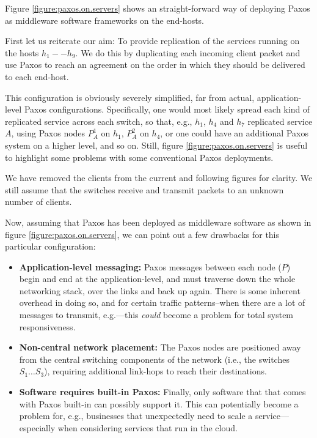Figure \vref{figure:paxos.on.servers} shows an straight-forward way of deploying
Paxos as middleware software frameworks on the end-hosts.

First let us reiterate our aim: To provide replication of the services
running on the hosts $h_1--h_9$. We do this by duplicating each incoming
client packet and use Paxos to reach an agreement on the order in which they
should be delivered to each end-host.

This configuration is obviously severely simplified, far from actual,
application-level Paxos configurations.
%
Specifically, one would most likely
spread each kind of replicated service across each switch, so that, e.g.,
$h_1$, $h_4$ and $h_7$ replicated service $A$, using Paxos nodes
$P_A^1$ on $h_1$, $P_A^2$ on $h_4$, or one could have an additional Paxos
system on a higher level, and so on.
%
Still, figure \ref{figure:paxos.on.servers} is useful to highlight some
problems with some conventional Paxos deployments.

We have removed the clients from the current and following figures for
clarity.  We still assume that the switches receive and transmit packets to
an unknown number of clients.

Now, assuming that Paxos has been deployed as middleware software as shown
in figure \ref{figure:paxos.on.servers}, we can point out a few drawbacks
for this particular configuration:

\begin{itemize}
  \item \textbf{Application-level messaging:}
  Paxos messages between each node ($P$) begin and end at the
  application-level, and must traverse down the whole networking
  stack, over the links and back up again.
  There is some inherent overhead in doing so, and for certain traffic
  patterns--when there are a lot of messages to transmit, e.g.---this
  \textit{could} become a problem for total system responsiveness.

  \item \textbf{Non-central network placement:}
  The Paxos nodes are positioned away from the central switching components
  of the network (i.e., the switches $S_1 \dots S_3$), requiring additional
  link-hops to reach their destinations.

  \item \textbf{Software requires built-in Paxos:}
  Finally, only software that that comes with Paxos built-in can possibly
  support it.  This can potentially become a problem for, e.g., businesses
  that unexpectedly need to scale a service---especially when considering
  services that run in the cloud.
\end{itemize}

